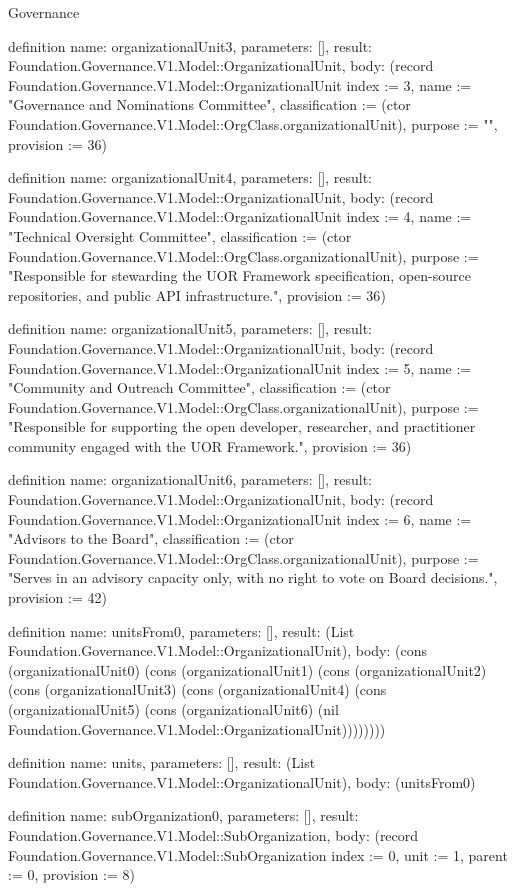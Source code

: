 \begin{lexlean}{Governance}
\begin{semanticmodule}
definition{
  name: organizationalUnit3,
  parameters: [],
  result: Foundation.Governance.V1.Model::OrganizationalUnit,
  body: (record Foundation.Governance.V1.Model::OrganizationalUnit {index := 3, name := "Governance and Nominations Committee", classification := (ctor Foundation.Governance.V1.Model::OrgClass.organizationalUnit), purpose := "", provision := 36})
}

definition{
  name: organizationalUnit4,
  parameters: [],
  result: Foundation.Governance.V1.Model::OrganizationalUnit,
  body: (record Foundation.Governance.V1.Model::OrganizationalUnit {index := 4, name := "Technical Oversight Committee", classification := (ctor Foundation.Governance.V1.Model::OrgClass.organizationalUnit), purpose := "Responsible for stewarding the UOR Framework specification, open-source repositories, and public API infrastructure.", provision := 36})
}

definition{
  name: organizationalUnit5,
  parameters: [],
  result: Foundation.Governance.V1.Model::OrganizationalUnit,
  body: (record Foundation.Governance.V1.Model::OrganizationalUnit {index := 5, name := "Community and Outreach Committee", classification := (ctor Foundation.Governance.V1.Model::OrgClass.organizationalUnit), purpose := "Responsible for supporting the open developer, researcher, and practitioner community engaged with the UOR Framework.", provision := 36})
}

definition{
  name: organizationalUnit6,
  parameters: [],
  result: Foundation.Governance.V1.Model::OrganizationalUnit,
  body: (record Foundation.Governance.V1.Model::OrganizationalUnit {index := 6, name := "Advisors to the Board", classification := (ctor Foundation.Governance.V1.Model::OrgClass.organizationalUnit), purpose := "Serves in an advisory capacity only, with no right to vote on Board decisions.", provision := 42})
}

definition{
  name: unitsFrom0,
  parameters: [],
  result: (List Foundation.Governance.V1.Model::OrganizationalUnit),
  body: (cons (organizationalUnit0) (cons (organizationalUnit1) (cons (organizationalUnit2) (cons (organizationalUnit3) (cons (organizationalUnit4) (cons (organizationalUnit5) (cons (organizationalUnit6) (nil Foundation.Governance.V1.Model::OrganizationalUnit))))))))
}

definition{
  name: units,
  parameters: [],
  result: (List Foundation.Governance.V1.Model::OrganizationalUnit),
  body: (unitsFrom0)
}

definition{
  name: subOrganization0,
  parameters: [],
  result: Foundation.Governance.V1.Model::SubOrganization,
  body: (record Foundation.Governance.V1.Model::SubOrganization {index := 0, unit := 1, parent := 0, provision := 8})
}


\end{semanticmodule}
\end{lexlean}

